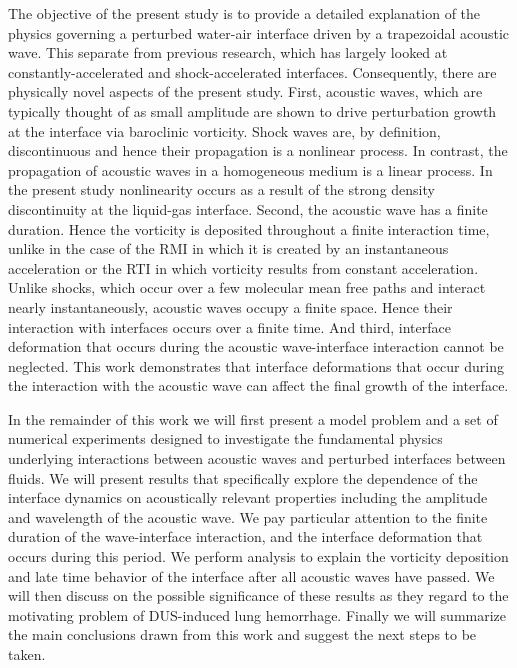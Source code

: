 \documentclass{jfm}%
\begin{document}
The objective of the present study is to provide a detailed
explanation of the physics governing a perturbed water-air interface
driven by a trapezoidal acoustic wave. This separate from previous
research, which has largely looked at constantly-accelerated and
shock-accelerated interfaces. Consequently, there are physically novel
aspects of the present study. First, acoustic waves, which are
typically thought of as small amplitude are shown to drive
perturbation growth at the interface via baroclinic vorticity. Shock
waves are, by definition, discontinuous and hence their propagation is
a nonlinear process. In contrast, the propagation of acoustic waves in
a homogeneous medium is a linear process. In the present study
nonlinearity occurs as a result of the strong density discontinuity at
the liquid-gas interface. Second, the acoustic wave has a finite
duration. Hence the vorticity is deposited throughout a finite
interaction time, unlike in the case of the \ac{RMI} in which it is
created by an instantaneous acceleration or the \ac{RTI} in which
vorticity results from constant acceleration. Unlike shocks, which
occur over a few molecular mean free paths and interact nearly
instantaneously, acoustic waves occupy a finite space. Hence their
interaction with interfaces occurs over a finite time. And third,
interface deformation that occurs during the acoustic wave-interface
interaction cannot be neglected. This work demonstrates that interface
deformations that occur during the interaction with the acoustic wave
can affect the final growth of the interface.

In the remainder of this work we will first present a model problem
and a set of numerical experiments designed to investigate the
fundamental physics underlying interactions between acoustic waves and
perturbed interfaces between fluids. We will present results that
specifically explore the dependence of the interface dynamics on
acoustically relevant properties including the amplitude and
wavelength of the acoustic wave. We pay particular attention to the
finite duration of the wave-interface interaction, and the interface
deformation that occurs during this period. We perform analysis to
explain the vorticity deposition and late time behavior of the
interface after all acoustic waves have passed. We will then discuss
on the possible significance of these results as they regard to the
motivating problem of \ac{DUS}-induced lung hemorrhage. Finally we
will summarize the main conclusions drawn from this work and suggest
the next steps to be taken.
\end{document}
